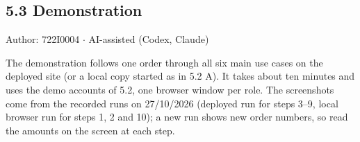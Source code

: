 \subsection*{5.3 Demonstration}
Author: 722I0004 \ensuremath{\cdot} AI-assisted (Codex, Claude)

The demonstration follows one order through all six main use cases on the deployed site \LinkDeployed (or a local copy started as in 5.2 A). It takes about ten minutes and uses the demo accounts of 5.2, one browser window per role. The screenshots come from the recorded runs on 27/10/2026 (deployed run for steps 3--9, local browser run for steps 1, 2 and 10); a new run shows new order numbers, so read the amounts on the screen at each step.

